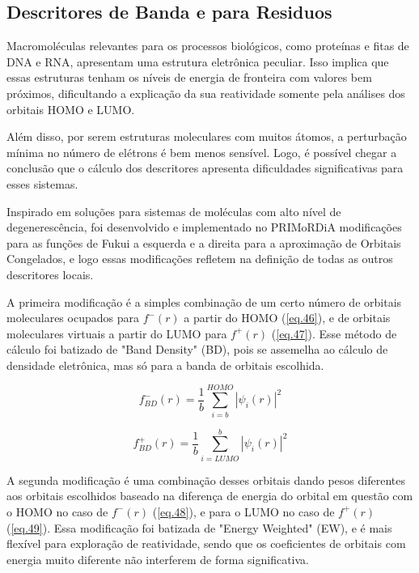 \documentclass[a4paper,11pt]{refart}
\begin{document}
\subsection{Descritores de Banda e para Residuos}

Macromoléculas relevantes para os processos biológicos, como proteínas e fitas de DNA e RNA, apresentam uma estrutura eletrônica peculiar. Isso implica que essas estruturas tenham os níveis de energia de fronteira com valores bem próximos, dificultando a explicação da sua reatividade somente pela análises dos orbitais HOMO e LUMO\cite{Fukushima2008}. 

Além disso, por serem estruturas moleculares com muitos átomos, a perturbação mínima no número de elétrons é bem menos sensível\cite{khandogin2003insights}. Logo, é possível chegar a conclusão que o cálculo dos descritores apresenta dificuldades significativas para esses sistemas. 

Inspirado em soluções para sistemas de moléculas com alto nível de degenerescência, foi desenvolvido e implementado no PRIMoRDiA modificações para as funções de Fukui a esquerda e a direita para a aproximação de Orbitais Congelados, e logo essas modificações refletem na definição de todas as outros descritores locais. 

A primeira modificação é a simples combinação de um certo número de orbitais moleculares ocupados para $f^-(r)$ a partir do HOMO (\autoref{eq.46}), e de orbitais moleculares virtuais a partir do LUMO para $f^+(r)$ (\autoref{eq.47}). Esse método de cálculo foi batizado de "Band Density" (BD), pois se assemelha ao cálculo de densidade eletrônica, mas só para a banda de orbitais escolhida. 

\begin{equation}
f^-_{BD}(r) = \frac{1}{b} \sum^{HOMO}_{i=b} |\psi_i(r)|^2 
\label{eq.46}
\end{equation}

\begin{equation}
f^+_{BD}(r) = \frac{1}{b} \sum^{b}_{i=LUMO} |\psi_i(r)|^2 
\label{eq.47}
\end{equation}

A segunda modificação é uma combinação desses orbitais dando pesos diferentes aos orbitais escolhidos baseado na diferença de energia do orbital em questão com o HOMO no caso de $f^-(r)$ (\autoref{eq.48}), e para o LUMO no caso de $f^+(r)$ (\autoref{eq.49}). Essa modificação foi batizada de "Energy Weighted" (EW), e é mais flexível para exploração de reatividade, sendo que os coeficientes de orbitais com energia muito diferente não interferem de forma significativa.   
\end{document}
